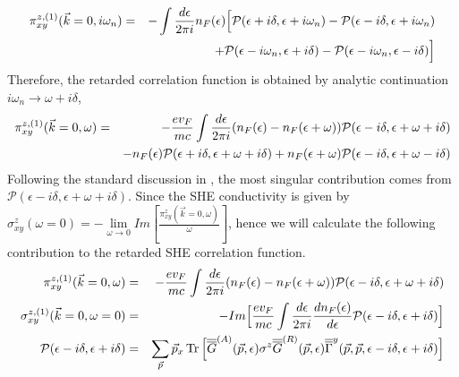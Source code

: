 \documentclass[letter,12pt,preprint,aps]{revtex4-1}
\newcommand{\ba}{\begin{eqnarray}}
\newcommand{\ea}{\end{eqnarray}}
\newcommand{\Gbar}{\overline{\overline{G}}}
\newcommand{\Gammabar}{\overline{\overline{\Gamma}}}
\begin{document}
\ba
\pi^{z, (1)}_{xy}(\vec{k} = 0, i \omega_n) & = & - \int \frac{d \epsilon}{2 \pi i} n_F(\epsilon) \Big[ \mathcal{P}(\epsilon + i \delta, \epsilon + i \omega_n) - \mathcal{P}(\epsilon - i \delta, \epsilon + i \omega_n) \cr
 & & + \mathcal{P}(\epsilon - i \omega_n, \epsilon + i \delta) - \mathcal{P}(\epsilon - i \omega_n, \epsilon - i \delta) \Big]
\ea
%
Therefore, the retarded correlation function is obtained by analytic continuation $i \omega_n \rightarrow \omega + i \delta$,
%
\ba
\pi^{z, (1)}_{xy}(\vec{k} = 0, \omega) & = & -\frac{e v_F}{m c} \int \frac{d \epsilon}{2 \pi i} (n_F(\epsilon) - n_F(\epsilon + \omega))  \mathcal{P}(\epsilon - i \delta, \epsilon + \omega + i \delta) \cr
 & & - n_F(\epsilon) \mathcal{P}(\epsilon + i \delta, \epsilon + \omega + i \delta) + n_F(\epsilon + \omega) \mathcal{P}(\epsilon - i \delta, \epsilon + \omega - i \delta)
\ea
%
Following the standard discussion in \cite{Mahan2000}, the most singular contribution comes from $\mathcal{P}(\epsilon - i \delta, \epsilon + \omega + i \delta)$. Since the SHE conductivity is given by $\sigma^{z}_{xy}(\omega = 0) = - \underset{\omega \to 0}{\lim} Im [ \tfrac{\pi^z_{xy}(\vec{k} =0, \omega)}{\omega} ]$, hence we will calculate the following contribution to the retarded SHE correlation function.
%
\ba
\label{eqn: retarded SHE correlation func}
\pi^{z, (1)}_{xy}(\vec{k} = 0, \omega) & = & -\frac{e v_F}{m c} \int \frac{d \epsilon}{2 \pi i} (n_F(\epsilon) - n_F(\epsilon + \omega))  \mathcal{P}(\epsilon - i \delta, \epsilon + \omega + i \delta) \cr
\sigma^{z, (1)}_{xy}(\vec{k} = 0, \omega =0) & = & -Im \Big[\frac{e v_F}{m c} \int \frac{d \epsilon}{2 \pi i} \frac{d n_F(\epsilon)}{d \epsilon}  \mathcal{P}(\epsilon - i \delta, \epsilon + i \delta) \Big] \cr
\mathcal{P}(\epsilon - i \delta, \epsilon + i \delta) & =  & \sum_{\vec{p}} \vec{p}_x \Tr \Big[ \Gbar^{(A)}(\vec{p}, \epsilon) \sigma^z \Gbar^{(R)}(\vec{p}, \epsilon) \Gammabar^{y}(\vec{p}, \vec{p}, \epsilon - i \delta, \epsilon + i \delta) \Big]
\ea
\end{document}

